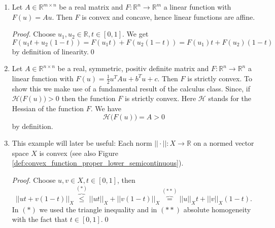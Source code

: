     \begin{example} %
    \label{ex:convex_function}

        \begin{enumerate}
            \item Let $A \in \mathbb{R}^{m \times n}$ be a real matrix and $F: \mathbb{R}^{n} \longrightarrow \mathbb{R}^{m}$ a linear function with $F(u) = Au$. Then $F$ is convex and concave, hence linear functions are affine.
                \begin{proof} %
                    Choose $u_{1}, u_{2} \in \mathbb{R}, t \in [0, 1]$. We get
                    $$
                       F(u_{1}t + u_{2}(1 - t)) = F(u_{1}t) + F(u_{2}(1 - t)) = F(u_{1})t + F(u_{2})(1 - t)
                    $$
                    by definition of linearity.\qed
                \end{proof}
            \item Let $A \in \mathbb{R}^{n \times n}$ be a real, symmetric, positiv definite matrix and $F: \mathbb{R}^{n} \longrightarrow \mathbb{R}^{n}$ a linear function with $F(u) = \frac{1}{2}u^{T}Au + b^{T}u + c$. Then $F$ is strictly convex. To show this we make use of a fundamental result of the calculus class. Since, if $\mathcal{H}\big(F(u)\big) > 0$ then the function $F$ is strictly convex. Here $\mathcal{H}$ stands for the Hessian of the function $F$. We have
                $$
                    \mathcal{H}\big(F(u)\big) = A > 0
                $$
            by definition.
            \item This example will later be useful: Each norm $||\cdot||: X \longrightarrow \mathbb{R}$ on a normed vector space $X$ is convex (see also Figure \ref{def:convex_function_proper_lower_semicontinuous}).
                \begin{proof} %
                    Choose $u, v \in X, t \in [0, 1]$, then
                    $$
                        ||ut + v(1 - t)||_{X} \overbrace{\le}^{(\ast)} ||ut||_{X} + ||v(1 - t)||_{X} \overbrace{=}^{(\ast\ast)} ||u||_{X} t + ||v||_{X} (1 - t).
                    $$
                    In $(\ast)$ we used the triangle inequality and in $(\ast\ast)$ absolute homogeneity with the fact that $t \in [0, 1]$.\qed
                \end{proof}
        \end{enumerate}

    \end{example}

